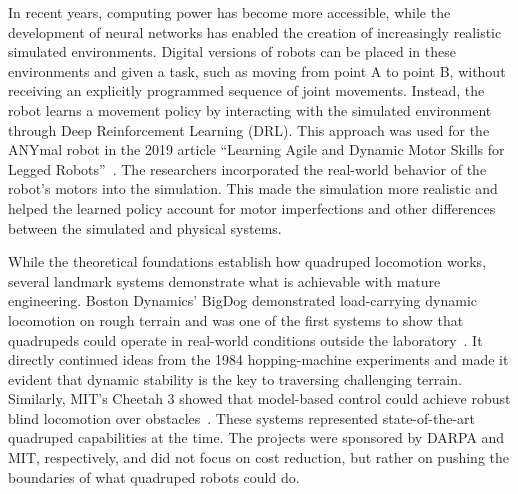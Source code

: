 \documentclass[a4paper,12pt]{report}
\begin{document}
In recent years, computing power has become more accessible, while the development of neural
networks has enabled the creation of increasingly realistic simulated environments. Digital
versions of robots can be placed in these environments and given a task, such as moving from point
A to point B, without receiving an explicitly programmed sequence of joint movements. Instead, the
robot learns a movement policy by interacting with the simulated environment through Deep
Reinforcement Learning (DRL). This approach was used for the ANYmal robot in the 2019 article
``Learning Agile and Dynamic Motor Skills for Legged Robots''~\parencite{hwangbo2019}. The
researchers incorporated the real-world behavior of the robot's motors into the simulation. This
made the simulation more realistic and helped the learned policy account for motor imperfections and
other differences between the simulated and physical systems.

While the theoretical foundations establish how quadruped locomotion works, several landmark systems
demonstrate what is achievable with mature engineering. Boston Dynamics' BigDog demonstrated
load-carrying dynamic locomotion on rough terrain and was one of the first systems to show that
quadrupeds could operate in real-world conditions outside the laboratory~\parencite{bigdog}. It
directly continued ideas from the 1984 hopping-machine experiments and made it evident that dynamic
stability is the key to traversing challenging terrain. Similarly, MIT's Cheetah 3 showed that
model-based control could achieve robust blind locomotion over obstacles~\parencite{cheetah3}.
These systems represented state-of-the-art quadruped capabilities at the time. The projects were
sponsored by DARPA and MIT, respectively, and did not focus on cost reduction, but rather on pushing
the boundaries of what quadruped robots could do.
\end{document}
